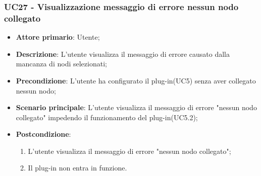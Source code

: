 \subsubsection{UC27 - Visualizzazione messaggio di errore nessun nodo collegato}
\label{sssec:uc27}
\begin{itemize}
  \item \textbf{Attore primario}: Utente;
  \item \textbf{Descrizione}: L'utente visualizza il messaggio di errore causato dalla mancanza di nodi selezionati;
  \item \textbf{Precondizione}: L'utente ha configurato il plug-in(UC5) senza aver collegato nessun nodo;
  \item \textbf{Scenario principale}: L'utente visualizza il messaggio di errore "nessun nodo collegato" impedendo il funzionamento del plug-in(UC5.2);
  \item \textbf{Postcondizione}:
  \begin{enumerate}
		\item L'utente visualizza il messaggio di errore "nessun nodo collegato";
		\item Il plug-in non entra in funzione.
	\end{enumerate}
\end{itemize}
